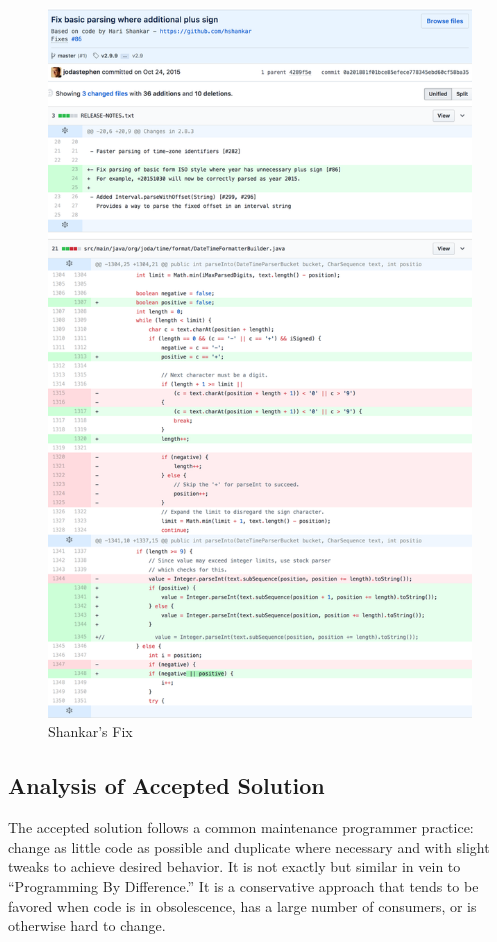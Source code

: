 \begin{figure}[H]
	\centering
	\includegraphics[height=\textheight]{Shankar'sFix}
	\caption{Shankar's Fix}
\end{figure}

\subsection{Analysis of Accepted Solution}

The accepted solution follows a common maintenance programmer practice: change as little code as possible and duplicate where necessary and with slight tweaks to achieve desired behavior. It is not exactly but similar in vein to “Programming By Difference.” It is a conservative approach that tends to be favored when code is in obsolescence, has a large number of consumers, or is otherwise hard to change.  


